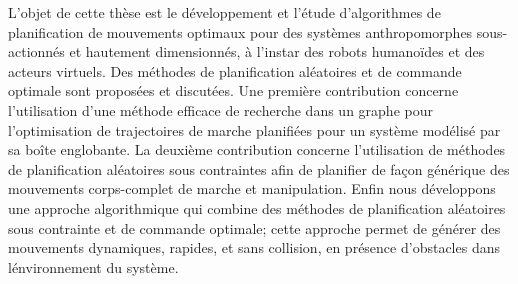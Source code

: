 \begin{resume}
L'objet de cette th\`ese est le d\'eveloppement et l'\'etude d'algorithmes
de planification de mouvements optimaux pour des syst\`emes
anthropomorphes sous-actionn\'es et hautement dimensionn\'es, \`a l'instar
des robots humano\"ides et des acteurs virtuels. Des m\'ethodes de
planification al\'eatoires et de commande optimale sont propos\'ees et
discut\'ees. Une premi\`ere contribution concerne l'utilisation d'une
m\'ethode efficace de recherche dans un graphe pour l'optimisation de
trajectoires de marche planifi\'ees pour un syst\`eme mod\'elis\'e par sa
boîte englobante. La deuxi\`eme contribution concerne l'utilisation de
m\'ethodes de planification al\'eatoires sous contraintes afin de
planifier de façon g\'en\'erique des mouvements corps-complet de marche et
manipulation. Enfin nous d\'eveloppons une approche algorithmique qui
combine des m\'ethodes de planification al\'eatoires sous contrainte et de
commande optimale; cette approche permet de g\'en\'erer des mouvements
dynamiques, rapides, et sans collision, en pr\'esence d'obstacles dans
l\'environnement du syst\`eme.
\end{resume}
